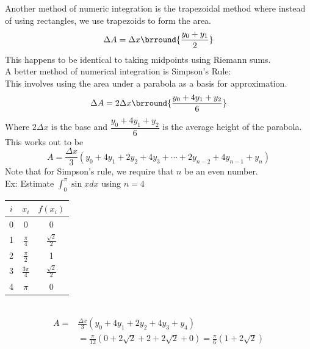 Another method of numeric integration is the trapezoidal method where instead of using rectangles, we use trapezoids to form the area.
$$\Delta A=\Delta x\brround{\frac{y_0+y_1}{2}}$$
This happens to be identical to taking midpoints using Riemann sums.\\
A better method of numerical integration is Simpson's Rule:\\
This involves using the area under a parabola as a basis for approximation.
$$\Delta A=2\Delta x\brround{\frac{y_0+4y_1+y_2}{6}}$$
Where $2\Delta x$ is the base and $\dfrac{y_0+4y_1+y_2}{6}$ is the average height of the parabola. This works out to be
$$A=\frac{\Delta x}{3}(y_0+4y_1+2y_2+4y_3+\cdots+2y_{n-2}+4y_{n-1}+y_n)$$
Note that for Simpson's rule, we require that $n$ be an even number.\\
Ex: Estimate $\int_0^\pi\sin xdx$ using $n=4$\\
\begin{tabular}{c|c|c}
    $i$ & $x_i$ & $f(x_i)$\\
    \hline
    0 & 0 & 0\\
    1 & $\frac{\pi}{4}$ & $\frac{\sqrt{2}}{2}$\\
    2 & $\frac{\pi}{2}$ & 1\\
    3 & $\frac{3\pi}{4}$ & $\frac{\sqrt{2}}{2}$\\
    4 & $\pi$ & 0
\end{tabular}\\
\begin{align*}
    A=&\frac{\Delta x}{3}(y_0+4y_1+2y_2+4y_3+y_4)\\
    &=\frac{\pi}{12}(0+2\sqrt{2}+2+2\sqrt{2}+0)=\frac{\pi}{6}(1+2\sqrt{2})
\end{align*}
